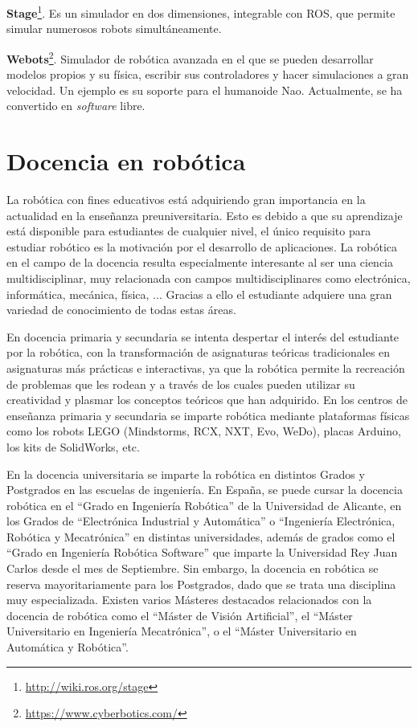 \textbf{Stage}\footnote{\url{http://wiki.ros.org/stage}}. Es un simulador en dos dimensiones, integrable con ROS, que permite simular numerosos robots simultáneamente.

\textbf{Webots}\footnote{\url{https://www.cyberbotics.com/}}. Simulador de robótica avanzada en el que se pueden desarrollar modelos propios y su física, escribir sus controladores y hacer simulaciones a gran velocidad. Un ejemplo es su soporte para el humanoide Nao. Actualmente, se ha convertido en \textit{software} libre.

\section{Docencia en robótica}
La robótica con fines educativos está adquiriendo gran importancia en la actualidad en la enseñanza preuniversitaria. Esto es debido a que su aprendizaje está disponible para estudiantes de cualquier nivel, el único requisito para estudiar robótico es la motivación por el desarrollo de aplicaciones. La robótica en el campo de la docencia resulta especialmente interesante al ser una ciencia multidisciplinar, muy relacionada con campos multidisciplinares como electrónica, informática, mecánica, física, ... Gracias a ello el estudiante adquiere una gran variedad de conocimiento de todas estas áreas.

En docencia primaria y secundaria se intenta despertar el interés del estudiante por la robótica, con la transformación de asignaturas teóricas tradicionales en asignaturas más prácticas e interactivas, ya que la robótica permite la recreación de problemas que les rodean y a través de los cuales pueden utilizar su creatividad y plasmar los conceptos teóricos que han adquirido.
En los centros de enseñanza primaria y secundaria se imparte robótica mediante plataformas físicas como los robots LEGO (Mindstorms, RCX, NXT, Evo, WeDo), placas Arduino, los kits de SolidWorks, etc.

En la docencia universitaria se imparte la robótica en distintos Grados y Postgrados en las escuelas de ingeniería. En España, se puede cursar la docencia robótica en el ``Grado en Ingeniería Robótica'' de la Universidad de Alicante, en los Grados de ``Electrónica Industrial y Automática'' o ``Ingeniería Electrónica, Robótica y Mecatrónica'' en distintas universidades, además de grados como el ``Grado en Ingeniería Robótica Software'' que imparte la Universidad Rey Juan Carlos desde el mes de Septiembre. Sin embargo, la docencia en robótica se reserva mayoritariamente para los Postgrados, dado que se trata una disciplina muy especializada. Existen varios Másteres destacados relacionados con la docencia de robótica como el ``Máster de Visión Artificial'', el ``Máster Universitario en Ingeniería Mecatrónica'', o el ``Máster Universitario en Automática y Robótica''.

